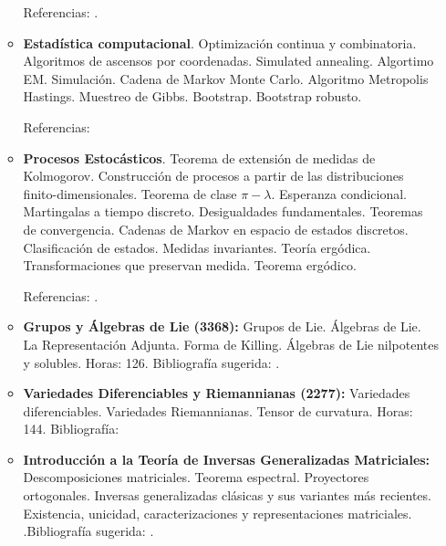 \documentclass[a4paper, 12pt]{article}
\begin{document}
\begin{enumerate}
\begin{itemize}
 
Referencias:  \cite{anderson, Everitt,  Hair, Jimenez2005,  Cuadras, mardia, Penia, johnson, Rencher}.







\item \textbf{Estadística computacional}. 
Optimización   continua y combinatoria. Algoritmos de ascensos por coordenadas. Simulated annealing. Algortimo EM. Simulación. Cadena de Markov Monte Carlo. Algoritmo Metropolis Hastings. Muestreo de Gibbs. Bootstrap. Bootstrap robusto.  


Referencias:    \cite{wrma, wrre, giho}




\item \textbf{Procesos Estocásticos}. Teorema de extensión de  medidas de Kolmogorov. Construcción de procesos a partir
de las distribuciones finito-dimensionales. Teorema de  clase $\pi-\lambda$. Esperanza condicional. Martingalas a tiempo
discreto. Desigualdades fundamentales. Teoremas de convergencia. Cadenas de Markov en espacio de estados discretos.
Clasificación de estados. Medidas invariantes. Teoría ergódica. Transformaciones que preservan medida. Teorema ergódico.

 

 Referencias: \cite{bremaud,ferrari, shir,   varadhan}.



\item\textbf{ Grupos y Álgebras de Lie (3368):}  Grupos de Lie. Álgebras de Lie. La Representación Adjunta. Forma de Killing. Álgebras de Lie nilpotentes y solubles.
Horas: 126. Bibliografía sugerida: \cite{boothby2003introduction, Helgason15,Loring11, Knapp96,Jancsa10,barros22}.

\item\textbf{ Variedades Diferenciables y Riemannianas  (2277):}
 Variedades diferenciables.  Variedades Riemannianas. Tensor de curvatura.  
 Horas: 144. Bibliografía: \cite{boothby2003introduction,docarmo15, 
 Carrizosev,Helgason15,Olmos18,Loring11,barros11}


\item\textbf{ Introducción a la Teoría de Inversas Generalizadas Matriciales:}  Descomposiciones matriciales. Teorema espectral. Proyectores ortogonales. Inversas generalizadas clásicas y sus variantes más recientes. Existencia, unicidad, caracterizaciones y representaciones matriciales. .Bibliografía sugerida: \cite{ CaMe, WaWeQi, MiBhMa, BaTr1, BaTr2, FeLeTh1, FeLeTh2, FeLeTh3, FeLePrTh, MaTh, PrMo,  MeSa, Wa}.


\end{itemize}
\end{enumerate}
\end{document}
